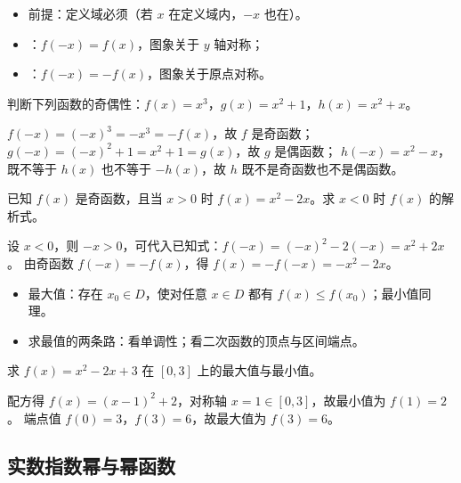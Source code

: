 \begin{explore}
\begin{itemize}
  \item 前提：定义域必须（若 $x$ 在定义域内，$-x$ 也在）。
  \item {}：$f(-x)=f(x)$，图象关于 $y$ 轴对称；
  \item {}：$f(-x)=-f(x)$，图象关于原点对称。
\end{itemize}

\begin{example}
判断下列函数的奇偶性：$f(x)=x^3$，$g(x)=x^2+1$，$h(x)=x^2+x$。
\end{example}
\begin{solution}
$f(-x)=(-x)^3=-x^3=-f(x)$，故 $f$ 是奇函数；
$g(-x)=(-x)^2+1=x^2+1=g(x)$，故 $g$ 是偶函数；
$h(-x)=x^2-x$，既不等于 $h(x)$ 也不等于 $-h(x)$，故 $h$ 既不是奇函数也不是偶函数。
\end{solution}

\begin{problem}
已知 $f(x)$ 是奇函数，且当 $x>0$ 时 $f(x)=x^2-2x$。求 $x<0$ 时 $f(x)$ 的解析式。
\end{problem}
\begin{solution}
设 $x<0$，则 $-x>0$，可代入已知式：$f(-x)=(-x)^2-2(-x)=x^2+2x$。
由奇函数 $f(-x)=-f(x)$，得 $f(x)=-f(-x)=-x^2-2x$。
\end{solution}

\begin{itemize}
  \item 最大值：存在 $x_0\in D$，使对任意 $x\in D$ 都有 $f(x)\leq f(x_0)$；最小值同理。
  \item 求最值的两条路：看单调性；看二次函数的顶点与区间端点。
\end{itemize}

\begin{problem}
求 $f(x)=x^2-2x+3$ 在 $[0,3]$ 上的最大值与最小值。
\end{problem}
\begin{solution}
配方得 $f(x)=(x-1)^2+2$，对称轴 $x=1\in[0,3]$，故最小值为 $f(1)=2$。
端点值 $f(0)=3$，$f(3)=6$，故最大值为 $f(3)=6$。
\end{solution}

\subsection{实数指数幂与幂函数}


\end{explore}
